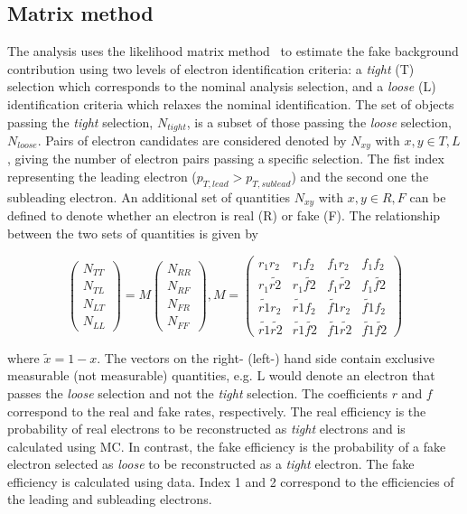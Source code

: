 \subsection{Matrix method}
The analysis uses the likelihood matrix method~\cite{Varnes:2016nrb} to estimate the fake background contribution using two levels of electron identification criteria: a \emph{tight} (T) selection which corresponds to the nominal analysis selection, and a \emph{loose} (L) identification criteria which relaxes the nominal identification. The set of objects passing the \emph{tight} selection, $N_{tight}$, is a subset of those passing the \emph{loose} selection, $N_{loose}$. Pairs of electron candidates are considered denoted by $N_{xy}$ with $x,y \in T,L$, giving the number of electron pairs passing a specific selection. The fist index representing the leading electron ($p_{T,lead} > p_{T,sublead}$) and the second one the subleading electron. An additional set of quantities $N_{xy}$ with $x,y \in R,F$ can be defined to denote whether an electron is real (R) or fake (F). The relationship between the two sets of quantities is given by~\cite{EXOT-2016-05}

\begin{equation}\label{eq:matrix_method_1}
\left(\begin{array}{c}N_{TT}\\ N_{TL}\\ N_{LT}\\ N_{LL}\end{array}\right) = M \left(\begin{array}{c}N_{RR}\\ N_{RF}\\ N_{FR}\\ N_{FF}\end{array}\right) , M =
    \begin{pmatrix}
    r_1r_2 & r_1f_2 &  f_1r_2 & f_1f_2\\
    r_1\tilde{r2} & r_1\tilde{f2} & f_1\tilde{r2} & f_1\tilde{f2}\\
    \tilde{r1}r_2 & \tilde{r1}f_2 & \tilde{f1}r_2 & \tilde{f1}f_2\\
    \tilde{r1}\tilde{r2} & \tilde{r1}\tilde{f2} & \tilde{f1}\tilde{r2} & \tilde{f1}\tilde{f2}  
    \end{pmatrix}
\end{equation}

where $\tilde{x} = 1 - x$. The vectors on the right- (left-) hand side contain exclusive measurable (not measurable) quantities, e.g. L would denote an electron that passes the \emph{loose} selection and not the \emph{tight} selection. The coefficients $r$ and $f$ correspond to the real and fake rates, respectively. The real efficiency is the probability of real electrons to be reconstructed as \emph{tight} electrons and is calculated using MC. In contrast, the fake efficiency is the probability of a fake electron selected as \emph{loose} to be reconstructed as a \emph{tight} electron. The fake efficiency is calculated using data. Index 1 and 2 correspond to the efficiencies of the leading and subleading electrons. 

